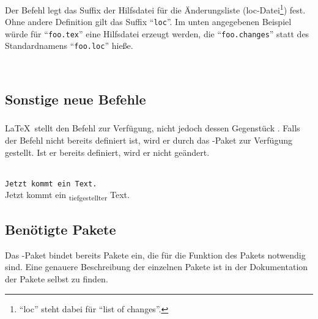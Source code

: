\subsubsection{}
\DescribeMacro{\setlocextension}

Der Befehl  legt das Suffix der Hilfsdatei für die Änderungsliste (loc-Datei\footnote{%
	"`loc"' steht dabei für "`list of changes"'.
}) fest.
Ohne andere Definition gilt das Suffix "`\texttt{loc}"'.
Im unten angegebenen Beispiel würde für "`\texttt{foo.tex}"' eine Hilfsdatei erzeugt werden, die "`\texttt{foo.changes}"' statt des Standardnamens "`\texttt{foo.loc}"' hieße.
\begin{chusage}
		\>\\
	\usageexample
		\>
\end{chusage}

\subsection{Sonstige neue Befehle}
\label{sec:user:other}

\subsubsection{}
\DescribeMacro{\textsubscript}

\LaTeX\ stellt den Befehl  zur Verfügung, nicht jedoch dessen Gegenstück .
Falls der Befehl nicht bereits definiert ist, wird er durch das -Paket zur Verfügung gestellt.
Ist er bereits definiert, wird er nicht geändert.
\begin{chusage}
		\>\\
	\usageexample
		\>\texttt{Jetzt kommt ein  Text.}\\
		\>Jetzt kommt ein \textsubscript{tiefgestellter} Text.
\end{chusage}


\subsection{Benötigte Pakete}
\label{sec:user:packages}

Das -Paket bindet bereits Pakete ein, die für die Funktion des Pakets notwendig sind.
Eine genauere Beschreibung der einzelnen Pakete ist in der Dokumentation der Pakete selbst zu finden.

